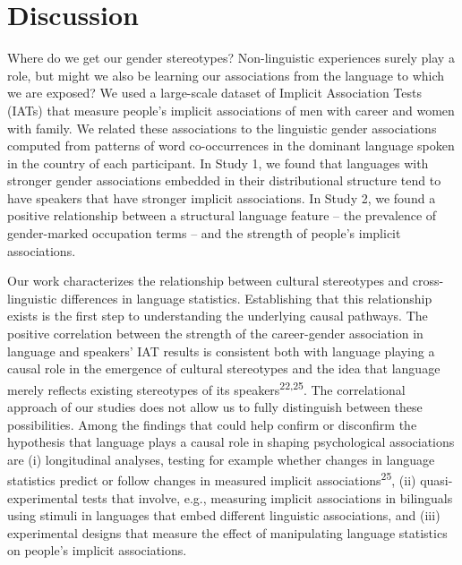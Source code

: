 \documentclass[9pt,twocolumn]{pnas-new}
\begin{document}
\section*{Discussion}\label{general-discussion}

Where do we get our gender stereotypes? Non-linguistic experiences surely play a role, but might we also be learning our associations from the language to which we are exposed? We used a large-scale dataset of Implicit Association Tests (IATs) that measure people's implicit associations of men with career and women with family. We related these associations to the linguistic gender associations computed from patterns of word co-occurrences in the dominant language spoken in the country of each participant. In Study 1, we found that languages with stronger gender associations embedded in their distributional structure tend to have speakers that have stronger implicit associations. In Study 2, we found a positive relationship between a structural language feature – the prevalence of gender-marked occupation terms – and the strength of people's implicit associations. 

Our work characterizes the relationship between cultural stereotypes and cross-linguistic differences in language statistics. Establishing that this relationship exists is the first step to understanding the underlying causal pathways. The positive correlation between the strength of the career-gender association in language and speakers' IAT results is consistent both with language playing a causal role in the emergence of cultural stereotypes and the idea that language merely reflects existing stereotypes of its speakers\textsuperscript{22,25}. The correlational approach of our studies does not allow us to fully distinguish between these possibilities. Among the findings that could help confirm or disconfirm the hypothesis that language plays a causal role in shaping psychological associations are (i) longitudinal analyses, testing for example whether changes in language statistics predict or follow changes in measured implicit associations\textsuperscript{25}, (ii) quasi-experimental tests that involve, e.g., measuring implicit associations in bilinguals using stimuli in languages that embed different linguistic associations, and (iii) experimental designs that measure the effect of manipulating language statistics on people's implicit associations.
\end{document}
